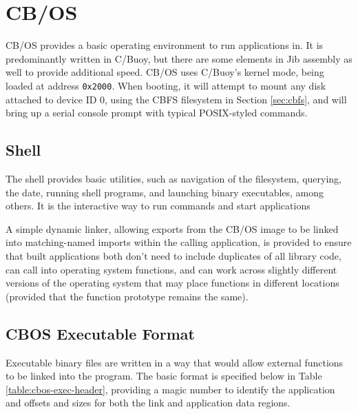 \documentclass{article}
\begin{document}
\pagebreak

\section{CB/OS}
\label{sec:cbos}

CB/OS provides a basic operating environment to run applications in. It is predominantly written in C/Buoy, but there are some elements in Jib assembly as well to provide additional speed. CB/OS uses C/Buoy's kernel mode, being loaded at address \texttt{0x2000}. When booting, it will attempt to mount any disk attached to device ID 0, using the CBFS filesystem in Section \ref{sec:cbfs}, and will bring up a serial console prompt with typical POSIX-styled commands.

\subsection{Shell}

The shell provides basic utilities, such as navigation of the filesystem, querying, the date, running shell programs, and launching binary executables, among others. It is the interactive way to run commands and start applications

A simple dynamic linker, allowing exports from the CB/OS image to be linked into matching-named imports within the calling application, is provided to ensure that built applications both don't need to include duplicates of all library code, can call into operating system functions, and can work across slightly different versions of the operating system that may place functions in different locations (provided that the function prototype remains the same).

\subsection{CBOS Executable Format}
\label{sec:cbos-application-header}

Executable binary files are written in a way that would allow external functions to be linked into the program. The basic format is specified below in Table \ref{table:cbos-exec-header}, providing a magic number to identify the application and offsets and sizes for both the link and application data regions.
\end{document}
